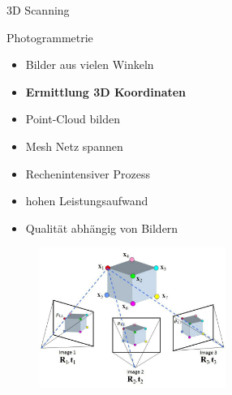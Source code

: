 \begin{frame}{3D Scanning}
    \begin{minipage}[m]{.49\textwidth}
    \begin{block}{Photogrammetrie}
        \begin{itemize}
            \item Bilder aus vielen Winkeln
            \item \textbf{Ermittlung 3D Koordinaten}
            \item Point-Cloud bilden
            \item Mesh Netz spannen
            \item Rechenintensiver Prozess
            \item hohen Leistungsaufwand
            \item Qualität abhängig von Bildern
        \end{itemize}
        \end{block}
    \end{minipage}
    \begin{minipage}[m]{.49\textwidth}
        \begin{figure}[]
          \includegraphics[height=130pt]{img_niklas/Structure-from-Motion-SfM-process-is-illustrated-The-structure-in-the.png}
          \label{fig:my_label}
      \end{figure}    
    \end{minipage}
    
\end{frame}

